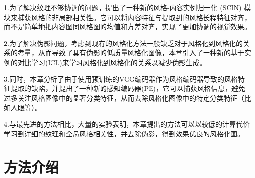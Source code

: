 \par 1.为了解决纹理不够协调的问题，提出了一种新的风格-内容实例归一化 (SCIN) 模块来捕获风格的非局部相关性。它可以将内容特征与提取到的风格长程特征对齐，而不是简单地把内容图同风格图的均值和方差对齐，实现了更加协调的视觉效果。
\par 2.为了解决伪影问题，考虑到现有的风格化方法一般缺乏对于风格化到风格化的关系的考量，从而导致了具有伪影的低质量风格化图像，本章引入了一种新的基于实例的对比学习(ICL)来学习风格化到风格化的关系以减少伪影生成。
\par 3.同时，本章分析了由于使用预训练的VGG编码器作为风格编码器导致的风格特征提取的缺陷，并提出了一种新的感知编码器(PE)，它可以捕获风格信息，避免过多关注风格图像中的显著分类特征，从而去除风格化图像中的特定分类特征（比如人眼等）。
\par 4.与最先进的方法相比，大量的实验表明，本章提出的方法可以以较低的计算代价学习到详细的纹理和全局风格相关性，并去除伪影，得到效果优良的风格化图。


\section{方法介绍}
